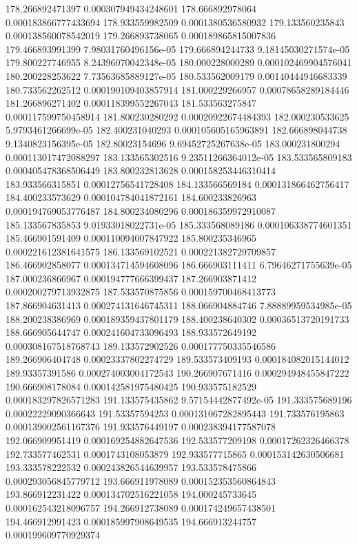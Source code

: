 {178.266892471397 0.000307949434248601
178.666892978064 0.000183866777433694
178.933559982509 0.0001380536580932
179.133560235843 0.000138560078542019
179.266893738065 0.000189865815007836
179.466893991399 7.98031760496156e-05
179.666894244733 9.18145030271574e-05
179.800227746955 8.24396070042348e-05
180.000228000289 0.000102469904576041
180.200228253622 7.73563685889127e-05
180.533562009179 0.00140444946683339
180.733562262512 0.000190109403857914
181.000229266957 0.00078658289184446
181.266896271402 0.000118399552267043
181.533563275847 0.000117599750458914
181.800230280292 0.00020922674484393
182.000230533625 5.9793461266699e-05
182.400231040293 0.000105605165963891
182.666898044738 9.1340823156395e-05
182.80023154696 9.69452725267638e-05
183.000231800294 0.000113017472088297
183.133565302516 9.23511266364012e-05
183.533565809183 0.000405478368506449
183.800232813628 0.000158253446310414
183.933566315851 0.00012756541728408
184.133566569184 0.000131866462756417
184.400233573629 0.000104784041872161
184.600233826963 0.000194769053776487
184.800234080296 0.000186359972910087
185.133567835853 9.01933018022731e-05
185.333568089186 0.000106338774601351
185.466901591409 0.000110094007847922
185.800235346965 0.000221612381641575
186.133569102521 0.000221382729709857
186.466902858077 0.000134714594608096
186.666903111411 6.79646271755639e-05
187.000236866967 0.000194777666399437
187.266903871412 0.000200279713932875
187.533570875856 0.000159700468413773
187.866904631413 0.000274131646745311
188.066904884746 7.88889959534985e-05
188.200238386969 0.000189359437801179
188.400238640302 0.00036513720191733
188.666905644747 0.000241604733096493
188.933572649192 0.000308167518768743
189.133572902526 0.000177750335546586
189.266906404748 0.00023337802274729
189.533573409193 0.000184082015144012
189.93357391586 0.000274003004172543
190.266907671416 0.000294948455847222
190.666908178084 0.000142581975480425
190.933575182529 0.000183297826571283
191.133575435862 9.57154442877492e-05
191.333575689196 0.00022229090366643
191.53357594253 0.000131067282895443
191.733576195863 0.000139002561167376
191.933576449197 0.000238394177587078
192.066909951419 0.000169254882647536
192.533577209198 0.00017262326466378
192.733577462531 0.0001743108053879
192.933577715865 0.000153142630506681
193.333578222532 0.000243826544639957
193.533578475866 0.000293056845779712
193.666911978089 0.000152353560864843
193.866912231422 0.000134702516221058
194.000245733645 0.000162543218096757
194.266912738089 0.000174249657438501
194.466912991423 0.000185997908649535
194.666913244757 0.000199609770929374
}
